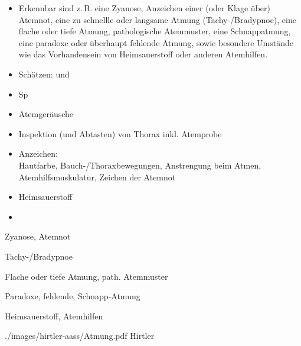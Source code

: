 {\begin{itemize}
  \item[\eye] Erkennbar sind z.\,B. eine Zyanose,
Anzeichen einer (oder Klage über) Atemnot, eine zu schnellle
oder langsame Atmung (Tachy-/Bradypnoe), eine flache oder
tiefe Atmung, pathologische Atemmuster, eine Schnappatmung,
eine paradoxe oder überhaupt fehlende Atmung, sowie
besondere Umstände wie das Vorhandensein von Heimsauerstoff
oder anderen Atemhilfen.
\end{itemize}
}{%
\begin{itemize}
  \item Schätzen:  und 
  \item Sp
  \item Atemgeräusche
  \item Inspektion (und Abtasten) von Thorax inkl. Atemprobe
  \item Anzeichen: \\
  Hautfarbe, Bauch-/Thorax\-bewegungen,
  Anstrengung beim Atmen, Atemhilfsmuskulatur, Zeichen der
  Atemnot
  \item Heimsauerstoff
  \item {}
\end{itemize}\begin{compactitem}
  \item[\eye] Zyanose, Atemnot
  \item[\eye] Tachy-/Bradypnoe
  \item[\eye] Flache oder tiefe Atmung, path. Atemmuster
  \item[\eye] Paradoxe, fehlende, Schnapp-Atmung
  \item[\eye] Heimsauerstoff, Atemhilfen
\end{compactitem}
}
{./images/hirtler-aass/Atmung.pdf}
{}
{Hirtler}

